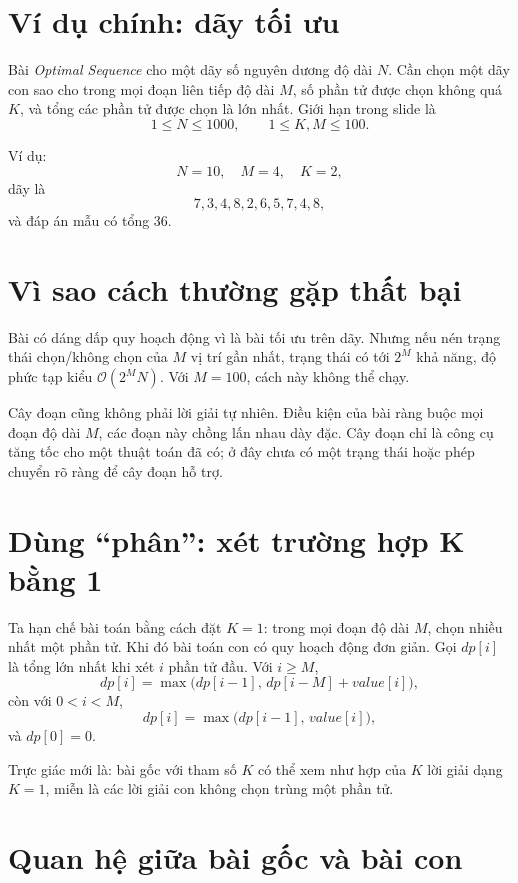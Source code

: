 \documentclass[11pt]{article}
\newcommand{\Oh}{\mathcal{O}}
\begin{document}
\section{Ví dụ chính: dãy tối ưu}

Bài \textit{Optimal Sequence} cho một dãy số nguyên dương độ dài \(N\). Cần
chọn một dãy con sao cho trong mọi đoạn liên tiếp độ dài \(M\), số phần tử
được chọn không quá \(K\), và tổng các phần tử được chọn là lớn nhất. Giới hạn
trong slide là
\[
  1\le N\le 1000,\qquad 1\le K,M\le 100.
\]

Ví dụ:
\[
  N=10,\quad M=4,\quad K=2,
\]
dãy là
\[
  7,3,4,8,2,6,5,7,4,8,
\]
và đáp án mẫu có tổng \(36\).

\section{Vì sao cách thường gặp thất bại}

Bài có dáng dấp quy hoạch động vì là bài tối ưu trên dãy. Nhưng nếu nén trạng
thái chọn/không chọn của \(M\) vị trí gần nhất, trạng thái có tới \(2^M\) khả
năng, độ phức tạp kiểu \(\Oh(2^M N)\). Với \(M=100\), cách này không thể chạy.

Cây đoạn cũng không phải lời giải tự nhiên. Điều kiện của bài ràng buộc mọi
đoạn độ dài \(M\), các đoạn này chồng lấn nhau dày đặc. Cây đoạn chỉ là công
cụ tăng tốc cho một thuật toán đã có; ở đây chưa có một trạng thái hoặc phép
chuyển rõ ràng để cây đoạn hỗ trợ.

\section{Dùng ``phân'': xét trường hợp K bằng 1}

Ta hạn chế bài toán bằng cách đặt \(K=1\): trong mọi đoạn độ dài \(M\), chọn
nhiều nhất một phần tử. Khi đó bài toán con có quy hoạch động đơn giản. Gọi
\(dp[i]\) là tổng lớn nhất khi xét \(i\) phần tử đầu. Với \(i\ge M\),
\[
  dp[i]=\max\bigl(dp[i-1],\,dp[i-M]+\mathit{value}[i]\bigr),
\]
còn với \(0<i<M\),
\[
  dp[i]=\max\bigl(dp[i-1],\,\mathit{value}[i]\bigr),
\]
và \(dp[0]=0\).

Trực giác mới là: bài gốc với tham số \(K\) có thể xem như hợp của \(K\) lời
giải dạng \(K=1\), miễn là các lời giải con không chọn trùng một phần tử.

\section{Quan hệ giữa bài gốc và bài con}
\end{document}

